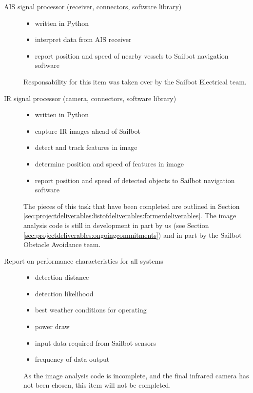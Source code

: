 \begin{description}
\item[AIS signal processor (receiver, connectors, software library)] \hfill
\begin{itemize}
\item written in Python
\item interpret data from AIS receiver
\item report position and speed of nearby vessels to Sailbot navigation software
\end{itemize}
Responsability for this item was taken over by the Sailbot Electrical team.

\item[IR signal processor (camera, connectors, software library)] \hfill
\begin{itemize}
\item written in Python
\item capture IR images ahead of Sailbot
\item detect and track features in image
\item determine position and speed of features in image
\item report position and speed of detected objects to Sailbot navigation software
\end{itemize}
The pieces of this task that have been completed are outlined in Section \ref{sec:projectdeliverables:listofdeliverables:formerdeliverables}. The image analysis code is still in development in part by us (see Section \ref{sec:projectdeliverables:ongoingcommitments}) and in part by the Sailbot Obstacle Avoidance team.

\item[Report on performance characteristics for all systems] \hfill
\begin{itemize}
\item detection distance
\item detection likelihood
\item best weather conditions for operating
\item power draw
\item input data required from Sailbot sensors
\item frequency of data output
\end{itemize}
As the image analysis code is incomplete, and the final infrared camera has not been chosen, this item will not be completed.
\end{description}

